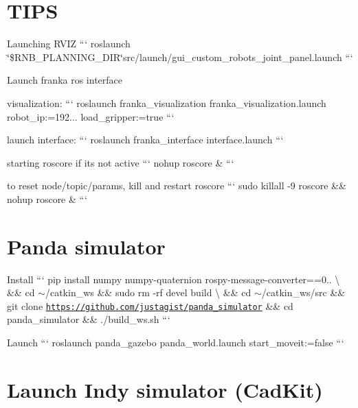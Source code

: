 \section*{T\+I\+PS}


\begin{DoxyItemize}
\item Launching R\+V\+IZ ``` roslaunch \char`\"{}\$\+R\+N\+B\+\_\+\+P\+L\+A\+N\+N\+I\+N\+G\+\_\+\+D\+I\+R\char`\"{}src/launch/gui\+\_\+custom\+\_\+robots\+\_\+joint\+\_\+panel.\+launch ```
\item Launch franka ros interface
\begin{DoxyItemize}
\item visualization\+: ``` roslaunch franka\+\_\+visualization franka\+\_\+visualization.\+launch robot\+\_\+ip\+:=192... load\+\_\+gripper\+:=true ```
\item launch interface\+: ``` roslaunch franka\+\_\+interface interface.\+launch ```
\end{DoxyItemize}
\item starting roscore if it\textquotesingle{}s not active ``` nohup roscore \& ```
\item to reset node/topic/params, kill and restart roscore ``` sudo killall -\/9 roscore \&\& nohup roscore \& ```
\end{DoxyItemize}

\section*{Panda simulator}


\begin{DoxyItemize}
\item Install ``` pip install numpy numpy-\/quaternion rospy-\/message-\/converter==0.. \textbackslash{} \&\& cd $\sim$/catkin\+\_\+ws \&\& sudo rm -\/rf devel build \textbackslash{} \&\& cd $\sim$/catkin\+\_\+ws/src \&\& git clone \href{https://github.com/justagist/panda_simulator}{\tt https\+://github.\+com/justagist/panda\+\_\+simulator} \&\& cd panda\+\_\+simulator \&\& ./build\+\_\+ws.sh ```
\item Launch ``` roslaunch panda\+\_\+gazebo panda\+\_\+world.\+launch start\+\_\+moveit\+:=false ```
\end{DoxyItemize}

\section*{Launch Indy simulator (Cad\+Kit)}


